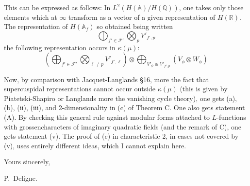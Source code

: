 \documentclass[11pt,a4paper]{article}
\theoremstyle{plain}
\theoremstyle{definition}
\theoremstyle{remark}
\newcommand{\Q}{\mathbb{Q}}
\newcommand{\R}{\mathbb{R}}
\begin{document}
This can be expressed as follows: In $L^{2}(H(\mathbb{A})/H(\Q))$, one takes only those elements which at $\infty$ transform as a vector of a given representation of $H(\R)$. The representation of $H(\mathbb{A}_{f})$ so obtained being written
\[
\bigoplus_{f' \in \mathcal{F}'} \bigotimes_{p} V'_{f',p}
\]
the following representation occurs in $\kappa(\mu)$:
\[
\left(\bigoplus_{f' \in \mathcal{F}'} \bigotimes_{\ell \neq p} V'_{f',\ell}\right) \otimes \bigoplus_{V'_{\phi} \cong V'_{f',p}} (V_{\phi} \otimes W_{\phi})
\]

Now, by comparison with Jacquet-Langlands \S16, more the fact that supercuspidal representations cannot occur outside $\kappa(\mu)$ (this is given by Piatetski-Shapiro or Langlands more the vanishing cycle theory), one gets (a), (b), (ii), (iii), and 2-dimensionality in (c) of Theorem C. One also gets statement (A). By checking this general rule against modular forms attached to $L$-functions with grossencharacters of imaginary quadratic fields (and the remark of C), one gets statement (v). The proof of (c) in characteristic 2, in cases not covered by (v), uses entirely different ideas, which I cannot explain here.

\bigskip
\bigskip

\noindent
\hfill Yours sincerely,

\noindent
\hfill P.~Deligne.
\end{document}
